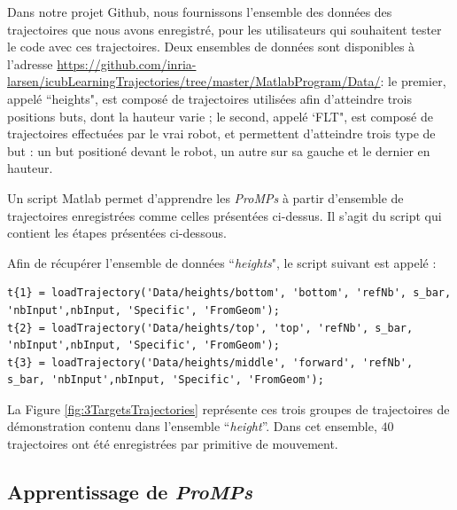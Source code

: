 \documentclass[utf8]{frontiersSCNS} %
\begin{document}
Dans notre projet Github, nous fournissons l'ensemble des données des trajectoires que nous avons enregistré, pour les utilisateurs qui souhaitent tester le code avec ces trajectoires. Deux ensembles de données sont disponibles à l'adresse \url{https://github.com/inria-larsen/icubLearningTrajectories/tree/master/MatlabProgram/Data/}:  le premier, appelé ``heights", est composé de trajectoires utilisées afin d'atteindre trois positions buts, dont la hauteur varie ; le second, appelé `FLT", est composé de trajectoires effectuées par le vrai robot, et permettent d'atteindre trois type de but : un but positioné devant le robot, un autre sur sa gauche et le dernier en hauteur.

Un script Matlab permet d'apprendre les \textit{ProMPs} à partir d'ensemble de trajectoires enregistrées comme celles présentées ci-dessus. Il s'agit du script  qui contient les étapes présentées ci-dessous.

Afin de récupérer l'ensemble de données ``\textit{heights}", le script suivant est appelé :
\begin{lstlisting}
t{1} = loadTrajectory('Data/heights/bottom', 'bottom', 'refNb', s_bar, 'nbInput',nbInput, 'Specific', 'FromGeom');
t{2} = loadTrajectory('Data/heights/top', 'top', 'refNb', s_bar, 'nbInput',nbInput, 'Specific', 'FromGeom');
t{3} = loadTrajectory('Data/heights/middle', 'forward', 'refNb', s_bar, 'nbInput',nbInput, 'Specific', 'FromGeom');
\end{lstlisting}

La Figure \ref{fig:3TargetsTrajectories} représente ces trois groupes de trajectoires de démonstration contenu dans l'ensemble ``\textit{height}''. Dans cet ensemble, $40$ trajectoires ont été enregistrées par primitive de mouvement.


\subsection{Apprentissage de \textit{ProMPs}}
\end{document}
